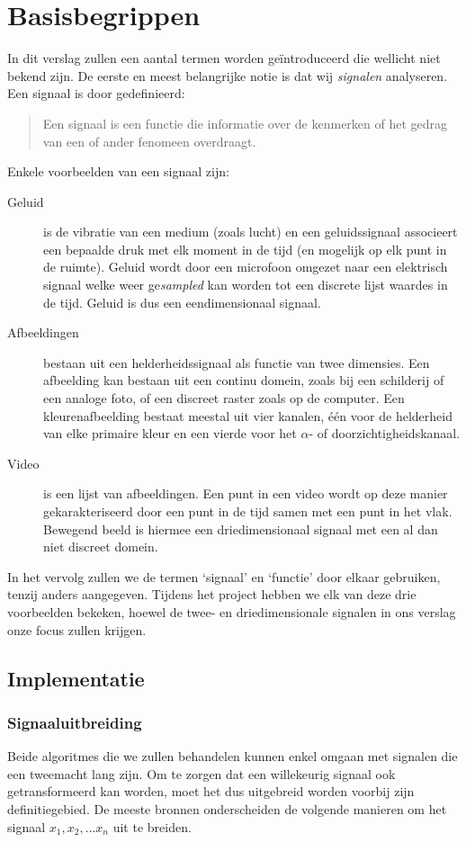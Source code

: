 \chapter{Basisbegrippen}
In dit verslag zullen een aantal termen worden ge\"introduceerd die wellicht niet bekend zijn. De eerste en meest belangrijke notie is dat wij \emph{signalen} analyseren. Een signaal is door \cite{signal} gedefinieerd:
\begin{quote}
Een signaal is een functie die informatie over de kenmerken of het gedrag van een of ander fenomeen overdraagt.
\end{quote}

Enkele voorbeelden van een signaal zijn:
\begin{description}
	\item[Geluid] is de vibratie van een medium (zoals lucht) en een geluidssignaal associeert een bepaalde druk met elk moment in de tijd (en mogelijk op elk punt in de ruimte). Geluid wordt door een microfoon omgezet naar een elektrisch signaal welke weer ge\emph{sampled} kan worden tot een discrete lijst waardes in de tijd. Geluid is dus een eendimensionaal signaal.
	\item[Afbeeldingen] bestaan uit een helderheidssignaal als functie van twee dimensies. Een afbeelding kan bestaan uit een continu domein, zoals bij een schilderij of een analoge foto, of een discreet raster zoals op de computer. Een kleurenafbeelding bestaat meestal uit vier kanalen, \'e\'en voor de helderheid van elke primaire kleur en een vierde voor het $\alpha$- of doorzichtigheidskanaal.
	\item[Video] is een lijst van afbeeldingen. Een punt in een video wordt op deze manier gekarakteriseerd door een punt in de tijd samen met een punt in het vlak. Bewegend beeld is hiermee een driedimensionaal signaal met een al dan niet discreet domein.
\end{description}

In het vervolg zullen we de termen `signaal' en `functie' door elkaar gebruiken, tenzij anders aangegeven. Tijdens het project hebben we elk van deze drie voorbeelden bekeken, hoewel de twee- en driedimensionale signalen in ons verslag onze focus zullen krijgen.

\section{Implementatie}
\subsection{Signaaluitbreiding}
\label{signaal}
Beide algoritmes die we zullen behandelen kunnen enkel omgaan met signalen die een tweemacht lang zijn. Om te zorgen dat een willekeurig signaal ook getransformeerd kan worden, moet het dus uitgebreid worden voorbij zijn definitiegebied. De meeste bronnen onderscheiden de volgende manieren om het signaal $x_1, x_2, \ldots x_n$ uit te breiden. \cite{mallat,pywt}

